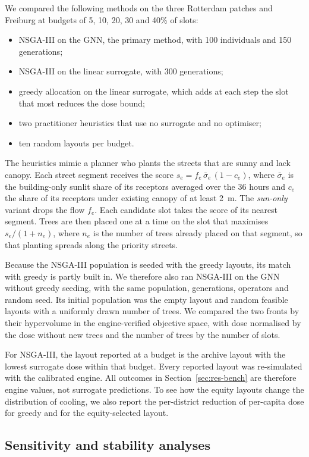 \documentclass[preprint,12pt,authoryear]{elsarticle}
\begin{document}
We compared the following methods on the three Rotterdam patches and Freiburg at budgets of 5, 10, 20, 30 and 40\% of slots:
\begin{itemize}
  \item NSGA-III on the GNN, the primary method, with 100 individuals and 150 generations;
  \item NSGA-III on the linear surrogate, with 300 generations;
  \item greedy allocation on the linear surrogate, which adds at each step the slot that most reduces the dose bound;
  \item two practitioner heuristics that use no surrogate and no optimiser;
  \item ten random layouts per budget.
\end{itemize}
The heuristics mimic a planner who plants the streets that are sunny and lack canopy. Each street segment receives the score $s_e = f_e\,\bar{\sigma}_e\,(1-c_e)$, where $\bar{\sigma}_e$ is the building-only sunlit share of its receptors averaged over the 36 hours and $c_e$ the share of its receptors under existing canopy of at least 2~m. The \emph{sun-only} variant drops the flow $f_e$. Each candidate slot takes the score of its nearest segment. Trees are then placed one at a time on the slot that maximises $s_e/(1+n_e)$, where $n_e$ is the number of trees already placed on that segment, so that planting spreads along the priority streets.

Because the NSGA-III population is seeded with the greedy layouts, its match with greedy is partly built in. We therefore also ran NSGA-III on the GNN without greedy seeding, with the same population, generations, operators and random seed. Its initial population was the empty layout and random feasible layouts with a uniformly drawn number of trees. We compared the two fronts by their hypervolume in the engine-verified objective space, with dose normalised by the dose without new trees and the number of trees by the number of slots.

For NSGA-III, the layout reported at a budget is the archive layout with the lowest surrogate dose within that budget. Every reported layout was re-simulated with the calibrated engine. All outcomes in Section~\ref{sec:res-bench} are therefore engine values, not surrogate predictions. To see how the equity layouts change the distribution of cooling, we also report the per-district reduction of per-capita dose for greedy and for the equity-selected layout.

\subsection{Sensitivity and stability analyses}\label{sec:sensitivity}
\end{document}
